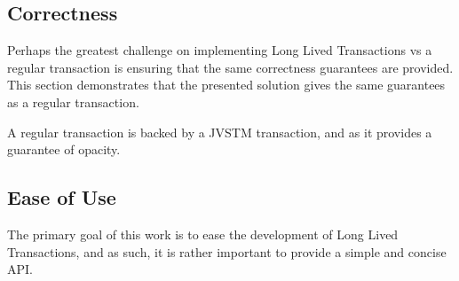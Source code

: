 \subsection{Correctness}

Perhaps the greatest challenge on implementing Long Lived Transactions
vs a regular transaction is ensuring that the same correctness
guarantees are provided. This section demonstrates that the presented
solution gives the same guarantees as a regular transaction.

A regular transaction is backed by a JVSTM transaction, and as it
provides a guarantee of opacity. 

\subsection{Ease of Use}

The primary goal of this work is to ease the development of Long Lived
Transactions, and as such, it is rather important to provide a simple
and concise API.